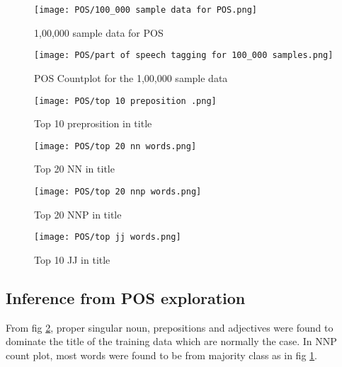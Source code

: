 \begin{figure}[H]
    \centering
    \texttt{[image: POS/100\_000 sample data for POS.png]}
    \caption{1,00,000 sample data for POS}
    \label{fig:1,00,000 sample data for POS}
\end{figure}

\begin{figure}[H]
    \centering
    \texttt{[image: POS/part of speech tagging for 100\_000 samples.png]}
    \caption{POS Countplot for the 1,00,000 sample data}
    \label{fig:POS Countplot for the 1,00,000 sample data}
\end{figure}

\begin{figure}[H]
    \centering
    \texttt{[image: POS/top 10 preposition .png]}
    \caption{Top 10 preprosition in title}
    \label{fig:Top 10 preprosition in title}
\end{figure}

\begin{figure}[H]
    \centering
    \texttt{[image: POS/top 20 nn words.png]}
    \caption{Top 20 NN in title}
    \label{fig:Top 20 NN in title}
\end{figure}

\begin{figure}[H]
    \centering
    \texttt{[image: POS/top 20 nnp words.png]}
    \caption{Top 20 NNP in title}
    \label{fig:Top 20 NNP in title}
\end{figure}

\begin{figure}[H]
    \centering
    \texttt{[image: POS/top jj words.png]}
    \caption{Top 10 JJ in title}
    \label{fig:Top 10 JJ in title}
\end{figure}

\subsection{Inference from POS exploration}
From fig \ref{fig:POS Countplot for the 1,00,000 sample data}, proper singular noun, prepositions and adjectives were found to dominate the title of the training data which are normally the case. In NNP count plot, most words were found to be from majority class as in fig \ref{fig:1,00,000 sample data for POS}.

